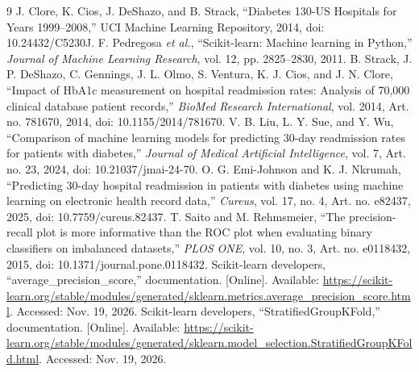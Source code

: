 \documentclass[conference]{IEEEtran}
\begin{document}
\begin{thebibliography}{9}
 J. Clore, K. Cios, J. DeShazo, and B. Strack, ``Diabetes 130-US Hospitals for Years 1999--2008,'' UCI Machine Learning Repository, 2014, doi: 10.24432/C5230J.
 F. Pedregosa \emph{et al.}, ``Scikit-learn: Machine learning in Python,'' \emph{Journal of Machine Learning Research}, vol. 12, pp. 2825--2830, 2011.
 B. Strack, J. P. DeShazo, C. Gennings, J. L. Olmo, S. Ventura, K. J. Cios, and J. N. Clore, ``Impact of HbA1c measurement on hospital readmission rates: Analysis of 70,000 clinical database patient records,'' \emph{BioMed Research International}, vol. 2014, Art. no. 781670, 2014, doi: 10.1155/2014/781670.
 V. B. Liu, L. Y. Sue, and Y. Wu, ``Comparison of machine learning models for predicting 30-day readmission rates for patients with diabetes,'' \emph{Journal of Medical Artificial Intelligence}, vol. 7, Art. no. 23, 2024, doi: 10.21037/jmai-24-70.
 O. G. Emi-Johnson and K. J. Nkrumah, ``Predicting 30-day hospital readmission in patients with diabetes using machine learning on electronic health record data,'' \emph{Cureus}, vol. 17, no. 4, Art. no. e82437, 2025, doi: 10.7759/cureus.82437.
 T. Saito and M. Rehmsmeier, ``The precision-recall plot is more informative than the ROC plot when evaluating binary classifiers on imbalanced datasets,'' \emph{PLOS ONE}, vol. 10, no. 3, Art. no. e0118432, 2015, doi: 10.1371/journal.pone.0118432.
 Scikit-learn developers, ``average\_precision\_score,'' documentation. [Online]. Available: \url{https://scikit-learn.org/stable/modules/generated/sklearn.metrics.average_precision_score.html}. Accessed: Nov. 19, 2026.
 Scikit-learn developers, ``StratifiedGroupKFold,'' documentation. [Online]. Available: \url{https://scikit-learn.org/stable/modules/generated/sklearn.model_selection.StratifiedGroupKFold.html}. Accessed: Nov. 19, 2026.
\end{thebibliography}
\end{document}
